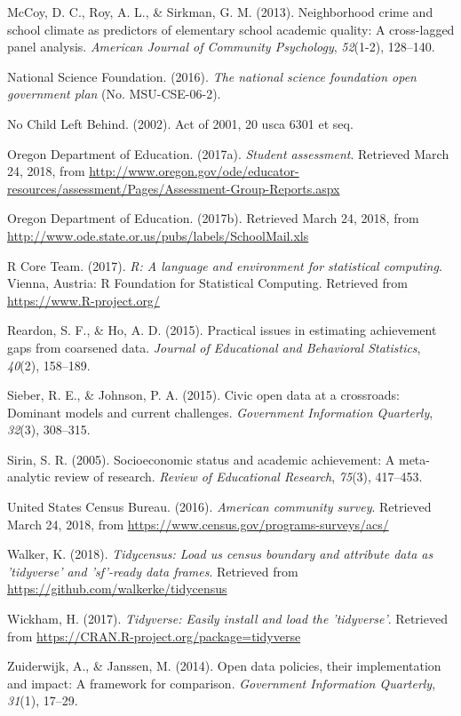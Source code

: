 \documentclass[man, fleqn, noextraspace]{apa6}
\theoremstyle{definition}
\theoremstyle{definition}
\theoremstyle{definition}
\theoremstyle{remark}
\begin{document}
\leavevmode\hypertarget{ref-mccoy13}{}%
McCoy, D. C., Roy, A. L., \& Sirkman, G. M. (2013). Neighborhood crime
and school climate as predictors of elementary school academic quality:
A cross-lagged panel analysis. \emph{American Journal of Community
Psychology}, \emph{52}(1-2), 128--140.

\leavevmode\hypertarget{ref-nsf16}{}%
National Science Foundation. (2016). \emph{The national science
foundation open government plan} (No. MSU-CSE-06-2).

\leavevmode\hypertarget{ref-nclb02}{}%
No Child Left Behind. (2002). Act of 2001, 20 usca 6301 et seq.

\leavevmode\hypertarget{ref-or17a}{}%
Oregon Department of Education. (2017a). \emph{Student assessment}.
Retrieved March 24, 2018, from
\url{http://www.oregon.gov/ode/educator-resources/assessment/Pages/Assessment-Group-Reports.aspx}

\leavevmode\hypertarget{ref-or17b}{}%
Oregon Department of Education. (2017b). Retrieved March 24, 2018, from
\url{http://www.ode.state.or.us/pubs/labels/SchoolMail.xls}

\leavevmode\hypertarget{ref-r}{}%
R Core Team. (2017). \emph{R: A language and environment for statistical
computing}. Vienna, Austria: R Foundation for Statistical Computing.
Retrieved from \url{https://www.R-project.org/}

\leavevmode\hypertarget{ref-reardon15}{}%
Reardon, S. F., \& Ho, A. D. (2015). Practical issues in estimating
achievement gaps from coarsened data. \emph{Journal of Educational and
Behavioral Statistics}, \emph{40}(2), 158--189.

\leavevmode\hypertarget{ref-sieber15}{}%
Sieber, R. E., \& Johnson, P. A. (2015). Civic open data at a
crossroads: Dominant models and current challenges. \emph{Government
Information Quarterly}, \emph{32}(3), 308--315.

\leavevmode\hypertarget{ref-sirin05}{}%
Sirin, S. R. (2005). Socioeconomic status and academic achievement: A
meta-analytic review of research. \emph{Review of Educational Research},
\emph{75}(3), 417--453.

\leavevmode\hypertarget{ref-acs}{}%
United States Census Bureau. (2016). \emph{American community survey}.
Retrieved March 24, 2018, from
\url{https://www.census.gov/programs-surveys/acs/}

\leavevmode\hypertarget{ref-tidycensus}{}%
Walker, K. (2018). \emph{Tidycensus: Load us census boundary and
attribute data as 'tidyverse' and 'sf'-ready data frames}. Retrieved
from \url{https://github.com/walkerke/tidycensus}

\leavevmode\hypertarget{ref-tidyverse}{}%
Wickham, H. (2017). \emph{Tidyverse: Easily install and load the
'tidyverse'}. Retrieved from
\url{https://CRAN.R-project.org/package=tidyverse}

\leavevmode\hypertarget{ref-zuiderwijk14}{}%
Zuiderwijk, A., \& Janssen, M. (2014). Open data policies, their
implementation and impact: A framework for comparison. \emph{Government
Information Quarterly}, \emph{31}(1), 17--29.

\endgroup
\end{document}
